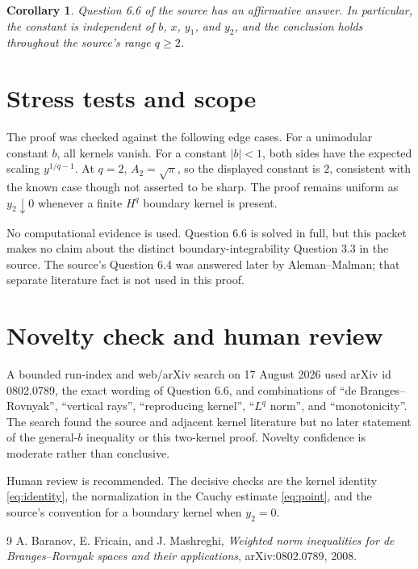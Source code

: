 \documentclass[11pt]{article}
\newtheorem{corollary}{Corollary}
\begin{document}
\begin{corollary}
Question 6.6 of the source has an affirmative answer.  In particular, the
constant is independent of $b$, $x$, $y_1$, and $y_2$, and the conclusion
holds throughout the source's range $q\ge2$.
\end{corollary}

\section{Stress tests and scope}

The proof was checked against the following edge cases.
For a unimodular constant $b$, all kernels vanish.  For a constant
$|b|<1$, both sides have the expected scaling $y^{1/q-1}$.  At $q=2$,
$A_2=\sqrt\pi$, so the displayed constant is $2$, consistent with the known
case though not asserted to be sharp.  The proof remains uniform as
$y_2\downarrow0$ whenever a finite $H^q$ boundary kernel is present.

No computational evidence is used.  Question 6.6 is solved in full, but this
packet makes no claim about the distinct boundary-integrability Question 3.3
in the source.  The source's Question 6.4 was answered later by
Aleman--Malman; that separate literature fact is not used in this proof.

\section{Novelty check and human review}

A bounded run-index and web/arXiv search on 17 August 2026 used arXiv id
0802.0789, the exact wording of Question 6.6, and combinations of
``de Branges--Rovnyak'', ``vertical rays'', ``reproducing kernel'',
``$L^q$ norm'', and ``monotonicity''.  The search found the source and
adjacent kernel literature but no later statement of the general-$b$
inequality or this two-kernel proof.  Novelty confidence is moderate rather
than conclusive.

Human review is recommended.  The decisive checks are the kernel identity
\eqref{eq:identity}, the normalization in the Cauchy estimate
\eqref{eq:point}, and the source's convention for a boundary kernel when
$y_2=0$.

\begin{thebibliography}{9}
A. Baranov, E. Fricain, and J. Mashreghi,
\emph{Weighted norm inequalities for de Branges--Rovnyak spaces and their
applications}, arXiv:0802.0789, 2008.
\end{thebibliography}
\end{document}
